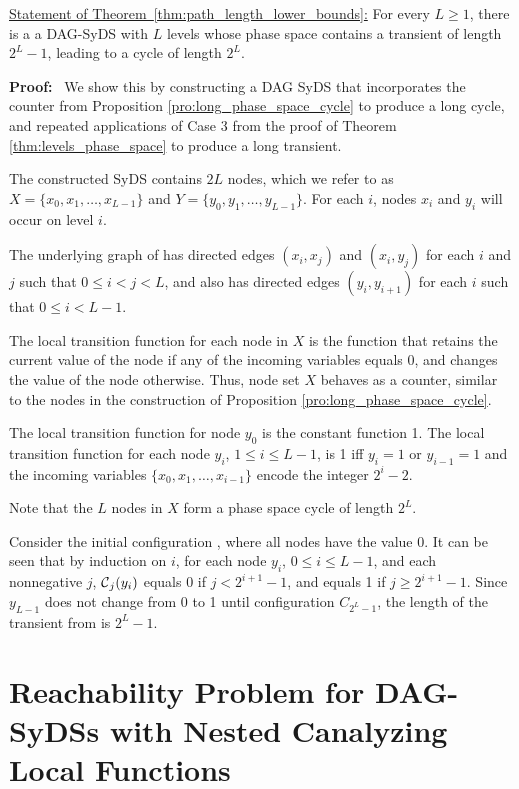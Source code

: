 \medskip

\noindent
\underline{Statement of Theorem~\ref{thm:path_length_lower_bounds}:}
For every $L  \geq 1$,
there is a a DAG-SyDS with $L$ levels
whose phase space contains a transient of length $2^L-1$,
leading to a cycle of length $2^L$.

\medskip

\noindent
\textbf{Proof:}~ 
We show this by constructing a DAG SyDS that
incorporates the counter from Proposition \ref{pro:long_phase_space_cycle}
to produce a long cycle, and repeated applications of Case 3 from
the proof of Theorem \ref{thm:levels_phase_space} to produce a long
transient.

The constructed SyDS \cals{}  contains
$2L$ nodes, which we refer to as $X = \{x_0, x_1, \dots , x_{L-1}\}$ 
and $Y = \{y_0, y_1, \dots , y_{L-1}\}$.
For each $i$, nodes $x_i$ and $y_i$ will occur on level $i$.

The underlying graph of \cals{} has directed edges
$(x_i, x_j)$  and $(x_i, y_j)$ for each $i$ and $j$  such that $0 \leq i < j  < L$,
and also has directed edges $(y_i, y_{i+1})$ for each $i$ such that $0 \leq i < L-1$.

The local transition function for each node in $X$ is the function 
that retains the current value of the node if any of the incoming variables equals 0,
and changes the value of the node otherwise.
Thus, node set $X$ behaves as a counter,
similar to the nodes in the construction of 
Proposition \ref{pro:long_phase_space_cycle}.

The local transition function for node $y_0$ is the constant function
1.  The local transition function for each node $y_i$, $1 \leq i
\leq L-1$, is 1 iff $y_i = 1$ or $y_{i-1} = 1$ and the incoming
variables $\{x_0, x_1, \dots , x_{i-1}\}$ encode the integer $2^i-2$.

Note that the $L$ nodes in $X$ form a phase space cycle of length $2^L$.

Consider the initial configuration \calc{}, where all nodes have the value 0.
It can be seen that by induction on $i$, for each node $y_i$, $0 \leq i \leq L-1$,
and each nonnegative $j$, 
$\mbox{$\mathcal{C}$}_j(y_i)$ equals 0 if $j < 2^{i+1} -1$, and equals 1 if $j \geq 2^{i+1} -1$.
Since $y_{L-1}$ does not change from 0 to 1 until configuration $C_{2^L-1}$, 
the length of the transient from \calc{} is $2^L-1$.
\QED

\section{Reachability Problem for DAG-SyDSs with Nested Canalyzing Local Functions}
\label{asec:reach_ncf}

